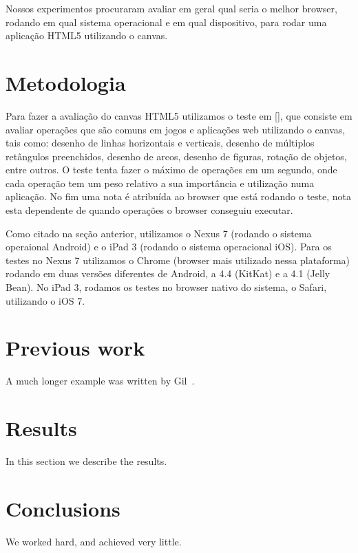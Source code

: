 \documentclass[12pt]{article}
\begin{document}
Nossos experimentos procuraram avaliar em geral qual seria o melhor browser, rodando em qual sistema operacional e
em qual dispositivo, para rodar uma aplicação HTML5 utilizando o canvas.

\section{Metodologia}
Para fazer a avaliação do canvas HTML5 utilizamos o teste em [], que consiste em avaliar operações que são comuns em
jogos e aplicações web utilizando o canvas, tais como: desenho de linhas horizontais e verticais, desenho de múltiplos
retângulos preenchidos, desenho de arcos, desenho de figuras, rotação de objetos, entre outros. O teste tenta fazer
o máximo de operações em um segundo, onde cada operação tem um peso relativo a sua importância e utilização numa
aplicação. No fim uma nota é atribuída ao browser que está rodando o teste, nota esta dependente de quando operações o
browser conseguiu executar.

Como citado na seção anterior, utilizamos o Nexus 7 (rodando o sistema operaional Android) e o iPad 3 (rodando o sistema
operacional iOS). Para os testes no Nexus 7 utilizamos o Chrome (browser mais utilizado nessa plataforma) rodando em
duas versões diferentes de Android, a 4.4 (KitKat) e a 4.1 (Jelly Bean). No iPad 3, rodamos os testes no browser nativo
do sistema, o Safari, utilizando o iOS 7.

\section{Previous work}\label{previous work}
A much longer \LaTeXe{} example was written by Gil~\cite{Einstein}.

\section{Results}\label{results}
In this section we describe the results.

\section{Conclusions}\label{conclusions}
We worked hard, and achieved very little.



\end{document}
